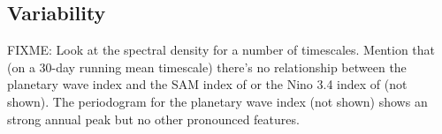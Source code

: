 \subsection{Variability}

FIXME: Look at the spectral density for a number of timescales. Mention that (on a 30-day running mean timescale) there's no relationship between the planetary wave index and the SAM index of \citet{Marshall2003} or the Nino 3.4 index of \citet{Trenberth2001} (not shown). The periodogram for the planetary wave index (not shown) shows an strong annual peak but no other pronounced features.